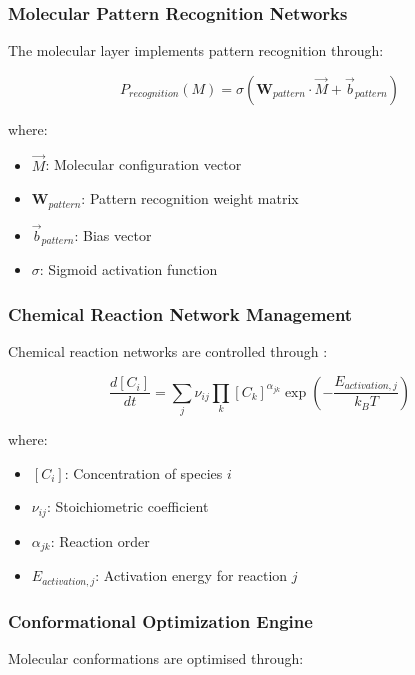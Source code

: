 \documentclass[12pt,a4paper]{article}
\begin{document}
\subsubsection{Molecular Pattern Recognition Networks}

The molecular layer implements pattern recognition through:

\begin{equation}
P_{recognition}(M) = \sigma\left(\mathbf{W}_{pattern} \cdot \vec{M} + \vec{b}_{pattern}\right)
\end{equation}

where:
\begin{itemize}
\item $\vec{M}$: Molecular configuration vector
\item $\mathbf{W}_{pattern}$: Pattern recognition weight matrix
\item $\vec{b}_{pattern}$: Bias vector
\item $\sigma$: Sigmoid activation function
\end{itemize}

\subsubsection{Chemical Reaction Network Management}

Chemical reaction networks are controlled through \cite{erdi2005mathematical}:

\begin{equation}
\frac{d[C_i]}{dt} = \sum_j \nu_{ij} \prod_k [C_k]^{\alpha_{jk}} \exp\left(-\frac{E_{activation,j}}{k_B T}\right)
\end{equation}

where:
\begin{itemize}
\item $[C_i]$: Concentration of species $i$
\item $\nu_{ij}$: Stoichiometric coefficient
\item $\alpha_{jk}$: Reaction order
\item $E_{activation,j}$: Activation energy for reaction $j$
\end{itemize}

\subsubsection{Conformational Optimization Engine}

Molecular conformations are optimised through:
\end{document}
